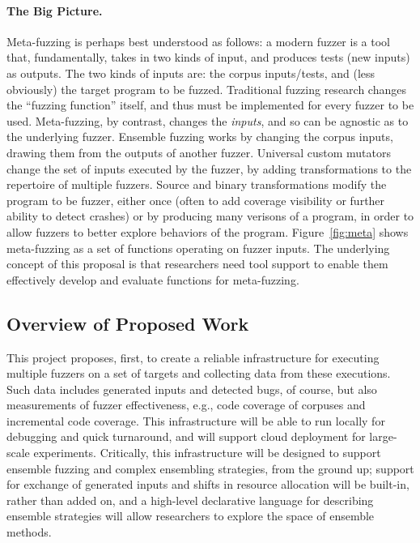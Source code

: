 \paragraph{The Big Picture.}  Meta-fuzzing is perhaps best understood
as follows: a modern fuzzer is a tool that, fundamentally, takes in
two kinds of input, and produces tests (new inputs) as outputs.  The
two kinds of inputs are:  the corpus inputs/tests, and (less
obviously) the target program to be fuzzed.
Traditional fuzzing research changes the ``fuzzing function''
itself, and thus must be implemented for every fuzzer to be
used. Meta-fuzzing, by contrast, changes the \emph{inputs}, and so can
be agnostic as to the underlying fuzzer.   Ensemble fuzzing works by
changing the corpus inputs, drawing them from the outputs of another
fuzzer.  Universal custom mutators change the set of
inputs executed by the fuzzer, by adding transformations to the
repertoire of multiple fuzzers.  Source and binary transformations
modify the program to be fuzzer, either once (often to add coverage
visibility or further ability to detect crashes) or by producing many
verisons of a program, in order to allow fuzzers to better explore
behaviors of the program.  Figure~\ref{fig:meta} shows meta-fuzzing as
a set of functions operating on fuzzer inputs.  The underlying concept
of this proposal is that researchers need tool support to enable them
effectively develop and evaluate functions for meta-fuzzing.




\subsection{Overview of Proposed Work}

This project proposes, first, to create a reliable infrastructure for executing 
multiple fuzzers on a set of targets and collecting data from these executions. 
 Such data includes generated inputs and detected bugs, of course, but also 
measurements of fuzzer effectiveness, e.g., code coverage of corpuses and 
incremental code coverage.  This infrastructure will be able to run locally for 
debugging and quick turnaround, and will support cloud deployment for 
large-scale experiments. Critically, this infrastructure will be designed to 
support ensemble fuzzing and complex ensembling strategies, from the ground up; 
support for exchange of generated inputs and shifts in resource allocation will 
be built-in, rather than added on, and a high-level declarative language for 
describing ensemble strategies will allow researchers to explore the space of 
ensemble methods.

